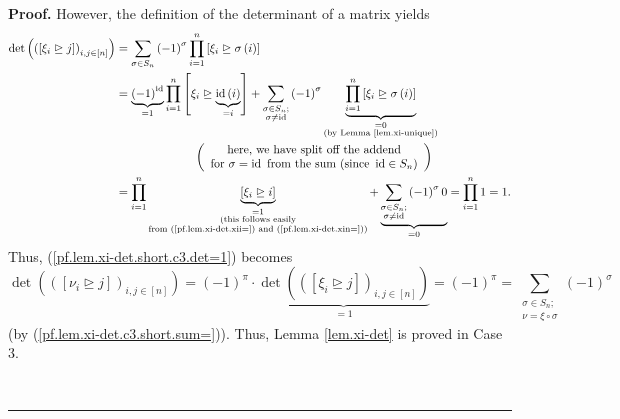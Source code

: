 \documentclass[numbers=enddot,12pt,final,onecolumn,notitlepage,english]{scrartcl}%
\theoremstyle{definition}
\newenvironment{proof}[1][Proof]{\noindent\textbf{#1.} }{\ \rule{0.5em}{0.5em}}
\let\sumnonlimits\sum
\let\prodnonlimits\prod
\renewcommand{\sum}{\sumnonlimits\limits}
\renewcommand{\prod}{\prodnonlimits\limits}
\newenvironment{vershort}{}{}
\begin{document}
\begin{proof}
\begin{vershort}
However, the definition of the determinant of a matrix yields%
\begin{align*}
\det\left(  \left(  \left[  \xi_{i}\trianglerighteq j\right]  \right)
_{i,j\in\left[  n\right]  }\right)   &  =\sum_{\sigma\in S_{n}}\left(
-1\right)  ^{\sigma}\prod_{i=1}^{n}\left[  \xi_{i}\trianglerighteq
\sigma\left(  i\right)  \right] \\
&  =\underbrace{\left(  -1\right)  ^{\operatorname*{id}}}_{=1}\prod_{i=1}%
^{n}\left[  \xi_{i}\trianglerighteq\underbrace{\operatorname*{id}\left(
i\right)  }_{=i}\right]  +\sum_{\substack{\sigma\in S_{n};\\\sigma
\neq\operatorname*{id}}}\left(  -1\right)  ^{\sigma}\underbrace{\prod
_{i=1}^{n}\left[  \xi_{i}\trianglerighteq\sigma\left(  i\right)  \right]
}_{\substack{=0\\\text{(by Lemma \ref{lem.xi-unique})}}}\\
&  \ \ \ \ \ \ \ \ \ \ \ \ \ \ \ \ \ \ \ \ \left(
\begin{array}
[c]{c}%
\text{here, we have split off the addend}\\
\text{for }\sigma=\operatorname*{id}\text{ from the sum (since }%
\operatorname*{id}\in S_{n}\text{)}%
\end{array}
\right) \\
&  =\prod_{i=1}^{n}\underbrace{\left[  \xi_{i}\trianglerighteq i\right]
}_{\substack{=1\\\text{(this follows easily}\\\text{from
(\ref{pf.lem.xi-det.xii=}) and (\ref{pf.lem.xi-det.xin=}))}}}+\underbrace{\sum
_{\substack{\sigma\in S_{n};\\\sigma\neq\operatorname*{id}}}\left(  -1\right)
^{\sigma}0}_{=0}=\prod_{i=1}^{n}1=1.
\end{align*}
Thus, (\ref{pf.lem.xi-det.short.c3.det=1}) becomes%
\[
\det\left(  \left(  \left[  \nu_{i}\trianglerighteq j\right]  \right)
_{i,j\in\left[  n\right]  }\right)  =\left(  -1\right)  ^{\pi}\cdot
\underbrace{\det\left(  \left(  \left[  \xi_{i}\trianglerighteq j\right]
\right)  _{i,j\in\left[  n\right]  }\right)  }_{=1}=\left(  -1\right)  ^{\pi
}=\sum_{\substack{\sigma\in S_{n};\\\nu=\xi\circ\sigma}}\left(  -1\right)
^{\sigma}%
\]
(by (\ref{pf.lem.xi-det.c3.short.sum=})). Thus, Lemma \ref{lem.xi-det} is
proved in Case 3. \medskip
\end{vershort}


\end{proof}
\end{document}
